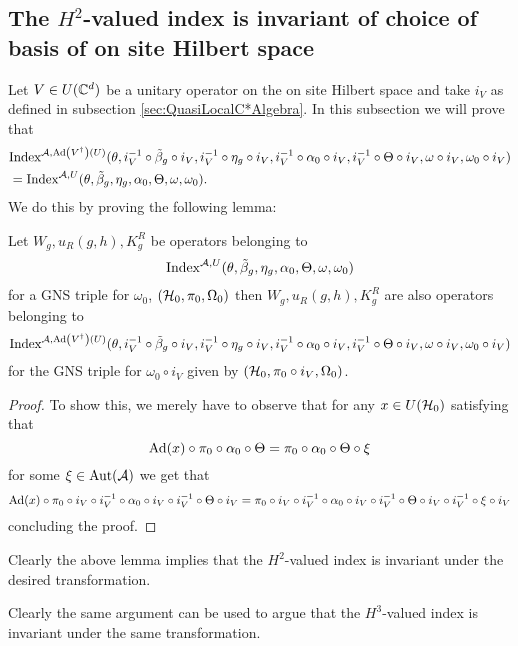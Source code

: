 \documentclass[11pt,a4paper,twoside]{article}
\numberwithin{equation}{section}
\begin{document}
\subsection{The $H^2$-valued index is invariant of choice of basis of on site Hilbert space}\label{sec:the-h2-valued-index-is-invariant-of-choice-of-basis-of-on-site-hilbert-space}
Let $V \in U(\CC^d)$ be a unitary operator on the on site Hilbert space and take $i_V$ as defined in subsection \ref{sec:QuasiLocalC*Algebra}. In this subsection we will prove that
\begin{align}
	&\textrm{Index}^{\AA,\Ad{V^\dagger}(U)}(\theta,i_V^{-1}\circ\tilde{\beta}_g\circ i_V,i_V^{-1}\circ\eta_g\circ i_V,i_V^{-1}\circ\alpha_0\circ i_V,i_V^{-1}\circ\Theta\circ i_V,\omega\circ i_V,\omega_0\circ i_V)\\
	&=\textrm{Index}^{\AA,U}(\theta,\tilde{\beta}_g,\eta_g,\alpha_0,\Theta,\omega,\omega_0).
\end{align}
We do this by proving the following lemma:
\begin{lemma}
	Let $W_g,u_R(g,h),K^R_g$ be operators belonging to
	\begin{equation}
		\textrm{Index}^{\AA,U}(\theta,\tilde{\beta}_g,\eta_g,\alpha_0,\Theta,\omega,\omega_0)
	\end{equation}
	for a GNS triple for $\omega_0$, $(\HH_0,\pi_0,\Omega_0)$ then $W_g,u_R(g,h),K^R_g$ are also operators belonging to
	\begin{equation}
		\textrm{Index}^{\AA,\Ad{V^\dagger}(U)}(\theta,i_V^{-1}\circ\tilde{\beta}_g\circ i_V,i_V^{-1}\circ\eta_g\circ i_V,i_V^{-1}\circ\alpha_0\circ i_V,i_V^{-1}\circ\Theta\circ i_V,\omega\circ i_V,\omega_0\circ i_V)
	\end{equation}
	for the GNS triple for $\omega_0\circ i_V$ given by $(\HH_0,\pi_0\circ i_V,\Omega_0)$.
\end{lemma}
\begin{proof}
	To show this, we merely have to observe that for any $x\in U(\HH_0)$ satisfying that
	\begin{equation}
		\Ad{x}\circ\pi_0\circ\alpha_0\circ\Theta =\pi_0\circ\alpha_0\circ\Theta\circ\xi
	\end{equation}
	for some $\xi\in\Aut{\AA}$ we get that
	\begin{equation}
		\Ad{x}\circ\pi_0\circ i_V\circ i_V^{-1}\circ\alpha_0\circ i_V\circ i_V^{-1}\circ\Theta\circ i_V =\pi_0\circ i_V\circ i_V^{-1}\circ\alpha_0\circ i_V\circ i_V^{-1}\circ\Theta\circ i_V\circ i_V^{-1}\circ\xi\circ i_V
	\end{equation}
	concluding the proof.
\end{proof}
Clearly the above lemma implies that the $H^2$-valued index is invariant under the desired transformation.
\begin{remark}\label{rem:OnSiteUnitaryTransformationH3ValuedIndex}
	Clearly the same argument can be used to argue that the $H^3$-valued index is invariant under the same transformation.
\end{remark}
\end{document}

